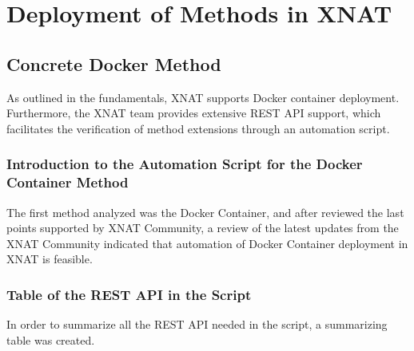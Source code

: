\chapter{Deployment of Methods in XNAT}
\section{Concrete Docker Method}
As outlined in the fundamentals, XNAT supports Docker container deployment. Furthermore, the XNAT team provides extensive REST API support, which facilitates the verification of method extensions through an automation script.

\subsection{Introduction to the Automation Script for the Docker Container Method}
The first method analyzed was the Docker Container, and after reviewed the last points supported by XNAT Community, a review of the latest updates from the XNAT Community indicated that automation of Docker Container deployment in XNAT is feasible.

\subsection{Table of the REST API in the Script}
In order to summarize all the REST API needed in the script, a summarizing table was created.

